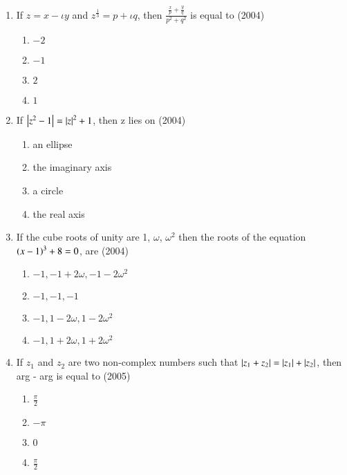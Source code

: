 \documentclass[journal,12pt,twocolumn]{IEEEtran}
\theoremstyle{remark}
\begin{document}
\begin{enumerate}
	\item{If $z=x-\iota y$ and $z^{\frac{1}{3}}=p+\iota q$, then $\frac{\frac{x}{p} + \frac{y}{q}}{p^2 + q^2}$ is equal to 
		\hfill (2004)
		\begin{multicols}{4}
		\begin{enumerate}
			\item{$-2$}
			\columnbreak
			\item{$-1$}
			\columnbreak
			\item{$2$}
			\columnbreak
			\item{$1$}
		\end{enumerate}
		\end{multicols}}

	\item{If $\left\vert z^2 - 1\right\vert = \left\vert z\right\vert^2 + 1$, then z lies on \hfill (2004)
		\begin{multicols}{2}
		\begin{enumerate}
			\item{an ellipse}
			\item{the imaginary axis}
			\columnbreak
			\item{a circle}
			\item{the real axis}
		\end{enumerate}
		\end{multicols}}
	

	\item{If the cube roots of unity are 1, $\omega$, $\omega^2$ then the roots of the equation $\left(x-1\right)^3 + 8 = 0$, are \hfill (2004)
		\begin{enumerate}
			\item{$-1,-1+2\omega,-1-2\omega ^2$}
			\item{$-1,-1,-1$}
			\item{$-1, 1-2\omega, 1-2\omega ^2$}
			\item{$-1, 1+2\omega, 1+2\omega ^2$}
		\end{enumerate}}

	\item{If $z_1$ and $z_2$ are two non-complex numbers such that $\left\vert z_1 + z_2\right\vert = \left\vert z_1\right\vert + \left\vert z_2\right\vert$, then arg - arg is equal to \hfill (2005)
		\begin{multicols}{4}
		\begin{enumerate}
			\item{$\frac{\pi}{2}$}
			\columnbreak
			\item{$-\pi$}
			\columnbreak
			\item{$0$}
			\columnbreak
			\item{$\frac{\pi}{2}$}
		\end{enumerate}
		\end{multicols}}


\end{enumerate}
\end{document}
